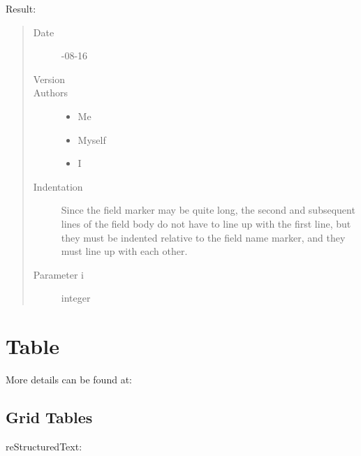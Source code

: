\documentclass[letterpaper,12pt,english]{sphinxmanual}
\begin{document}
Result:
\begin{quote}\begin{description}
\item[{Date}] -08-16

\item[{Version}] 

\item[{Authors}] \leavevmode\begin{itemize}
\item {} 
Me

\item {} 
Myself

\item {} 
I

\end{itemize}

\item[{Indentation}] \leavevmode
Since the field marker may be quite long, the second
and subsequent lines of the field body do not have to line up
with the first line, but they must be indented relative to the
field name marker, and they must line up with each other.

\item[{Parameter i}] \leavevmode
integer

\end{description}\end{quote}


\section{Table}
\label{\detokenize{rtxt:table}}
More details can be found at: 


\subsection{Grid Tables}
\label{\detokenize{rtxt:grid-tables}}
reStructuredText:
\end{document}

